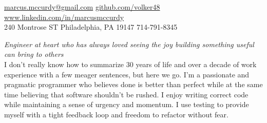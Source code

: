 \documentclass[10pt,a4paper]{article}
\begin{document}
\sloppy  %


\nobreakvspace{0.3em}  %

\noindent\href{mailto:marcus.mccurdy@gmail.com}
{marcus.mccurdy\mbox{}@\mbox{}gmail.com}\sbull
\href{http://github.com/volker48}{github.com/volker48} \sbull
\href{http://www.linkedin.com/in/marcusmccurdy}
    {www.linkedin.com/in/marcusmccurdy}
\\
240 Montrose ST\sbull
Philadelphia, PA 19147 \sbull {}714-791-8345

\spacedhrule{0.9em}{-0.4em}  %


\vspace{-1.3em}  %
\begin{multicols}{2}  %
\noindent \emph{Engineer at heart who has always loved 
seeing the joy building something useful can bring to
others}
\\

I don't really know how to summarize 30 years of life and over a decade of 
work experience with a few meager sentences, but here we go. 
I'm a passionate and pragmatic programmer who believes done is better than 
perfect while at the same time believing that software shouldn't be rushed. 
I enjoy writing correct code while maintaining a sense of urgency and momentum. 
I use testing to provide myself with a tight feedback loop and freedom to 
refactor without fear.
\end{multicols}


\spacedhrule{0em}{-0.4em}

\end{document}
